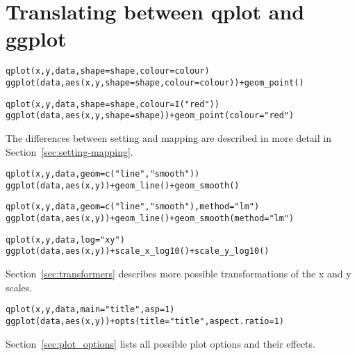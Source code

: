 \section{Translating between qplot and ggplot}
\label{sec:qplot-ggplot}


\begin{alltt}
qplot(x, y, data, shape=shape, colour = colour)
ggplot(data, aes(x, y, shape=shape, colour = colour)) + geom_point()
\end{alltt}

\begin{alltt}
qplot(x, y, data, shape=shape, colour = I("red"))
ggplot(data, aes(x, y, shape=shape)) + geom_point(colour="red")
\end{alltt}

The differences between setting and mapping are described in more detail in Section~\ref{sec:setting-mapping}.

\begin{alltt}
qplot(x, y, data, geom=c("line", "smooth"))
ggplot(data, aes(x, y)) + geom_line() + geom_smooth()
\end{alltt}

\begin{alltt}
qplot(x, y, data, geom=c("line", "smooth"), method="lm")
ggplot(data, aes(x, y)) + geom_line() + geom_smooth(method="lm")
\end{alltt}


\begin{alltt}
qplot(x, y, data, log="xy")
ggplot(data, aes(x, y)) + scale_x_log10() + scale_y_log10()
\end{alltt}

Section~\ref{sec:transformers} describes more possible transformations of the x and y scales.

\begin{alltt}
qplot(x, y, data, main="title", asp = 1)
ggplot(data, aes(x, y)) + opts(title = "title", aspect.ratio = 1)
\end{alltt}

Section~\ref{sec:plot_options} lists all possible plot options and their effects.



